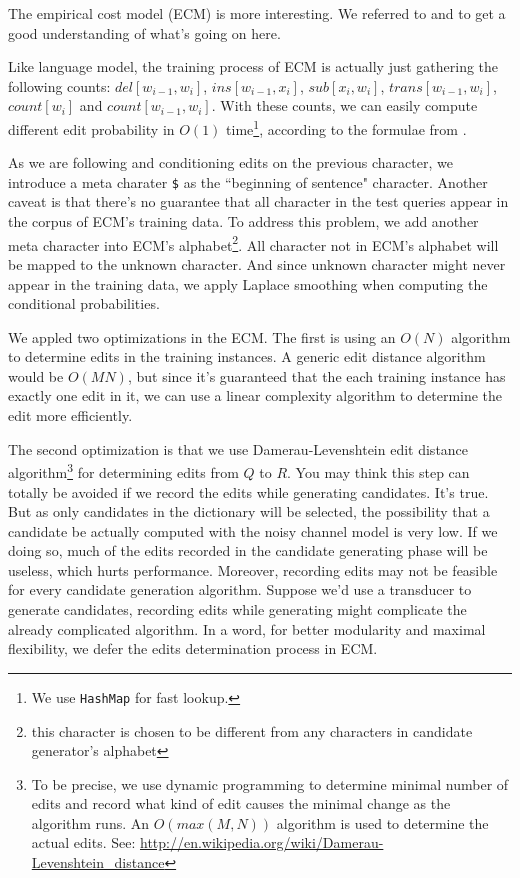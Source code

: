 \documentclass{article}
\begin{document}
The empirical cost model (ECM) is more interesting. We referred to \cite{jm-book} and \cite{kernighan-1990} to get a good understanding of what's going on here.

Like language model, the training process of ECM is actually just gathering the following counts: $del[w_{i-1},w_i]$, $ins[w_{i-1},x_i]$, $sub[x_i,w_i]$, $trans[w_{i-1},w_i]$, $count[w_i]$ and $count[w_{i-1},w_i]$. With these counts, we can easily compute different edit probability in $O(1)$ time\footnote{We use \texttt{HashMap} for fast lookup.}, according to the formulae from \cite{kernighan-1990}.

As we are following \cite{kernighan-1990} and conditioning edits on the previous character, we introduce a meta charater \texttt{\$} as the ``beginning of sentence" character. Another caveat is that there's no guarantee that all character in the test queries appear in the corpus of ECM's training data. To address this problem, we add another meta character into ECM's alphabet\footnote{this character is chosen to be different from any characters in candidate generator's alphabet}. All character not in ECM's alphabet will be mapped to the unknown character. And since unknown character might never appear in the training data, we apply Laplace smoothing when computing the conditional probabilities.

We appled two optimizations in the ECM. The first is using an $O(N)$ algorithm to determine edits in the training instances. A generic edit distance algorithm would be $O(MN)$, but since it's guaranteed that the each training instance has exactly one edit in it, we can use a linear complexity algorithm to determine the edit more efficiently.

The second optimization is that we use Damerau-Levenshtein edit distance algorithm\footnote{To be precise, we use dynamic programming to determine minimal number of edits and record what kind of edit causes the minimal change as the algorithm runs. An $O(max(M,N))$ algorithm is used to determine the actual edits. See: \url{http://en.wikipedia.org/wiki/Damerau-Levenshtein\_distance}} for determining edits from $Q$ to $R$. You may think this step can totally be avoided if we record the edits while generating candidates. It's true. But as only candidates in the dictionary will be selected, the possibility that a candidate be actually computed with the noisy channel model is very low. If we doing so, much of the edits recorded in the candidate generating phase will be useless, which hurts performance. Moreover, recording edits may not be feasible for every candidate generation algorithm. Suppose we'd use a transducer to generate candidates, recording edits while generating might complicate the already complicated algorithm. In a word, for better modularity and maximal flexibility, we defer the edits determination process in ECM.
\end{document}
